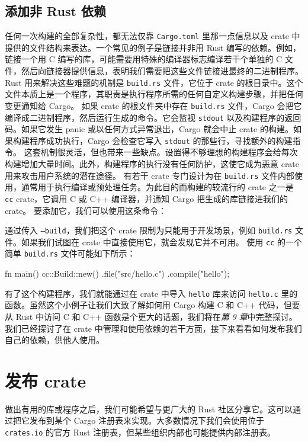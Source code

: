 \subsection{添加非 Rust 依赖}
\label{idx:idx_6a9cbb19}
任何一次构建的全部复杂性，都无法仅靠 \texttt{Cargo.toml} 里那一点信息以及 crate 中提供的文件结构来表达。一个常见的例子是链接并非用 Rust 编写的依赖。例如，链接一个用 C 编写的库，可能需要用特殊的编译器标志编译若干个单独的 C 文件，然后向链接器提供信息，表明我们需要把这些文件链接进最终的二进制程序。
Rust 用来解决这些难题的机制是 \texttt{build.rs} 文件，它位于 crate 的根目录中。这个文件本质上是一个程序，其职责是执行程序所需的任何自定义构建步骤，并把任何变更通知给 Cargo。
如果 crate 的根文件夹中存在 \texttt{build.rs} 文件，Cargo 会把它编译成二进制程序，然后运行生成的命令。它会监视 \texttt{stdout} 以及构建程序的返回码。如果它发生 panic 或以任何方式异常退出，Cargo 就会中止 crate 的构建。如果构建程序成功执行，Cargo 会检查它写入 \texttt{stdout} 的那些行，寻找额外的构建指令。
\label{idx:idx_a601076a}
这套机制很灵活，但也带来一些缺点。设置得不够理想的构建程序会给每次构建增加大量时间。此外，构建程序的执行没有任何防护，这使它成为恶意 crate 用来攻击用户系统的潜在途径。
有若干 crate 专门设计为在 \texttt{build.rs} 文件内部使用，通常用于执行编译或预处理任务。为此目的而构建的较流行的 crate 之一是 \texttt{cc} crate，它调用 C 或 C++ 编译器，并通知 Cargo 把生成的库链接进我们的 crate。
要添加它，我们可以使用这条命令：
通过传入 \texttt{--build}，我们把这个 crate 限制为只能用于开发场景，例如
\texttt{build.rs} 文件。如果我们试图在 crate 中直接使用它，就会发现它并不可用。
使用 \texttt{cc} 的一个简单 \texttt{build.rs} 文件可能如下所示：
\begin{codebox}[rust]
fn main() {
    cc::Build::new()
        .file("src/hello.c")
        .compile("hello");
}
\end{codebox}
\label{idx:idx_0c5153d5}
有了这个构建程序，我们就能通过在 crate 中导入 \texttt{hello} 库来访问 \texttt{hello.c} 里的函数。虽然这个小例子让我们大致了解如何用 Cargo 构建 C 和 C++ 代码，但要从 Rust 中访问 C 和 C++ 函数是个更大的话题，我们将在\emph{第 9 章}中完整探讨。
我们已经探讨了在 crate 中管理和使用依赖的若干方面，接下来看看如何发布我们自己的依赖，供他人使用。
\section{发布 crate}
\label{idx:idx_147c0b5a}
做出有用的库或程序之后，我们可能希望与更广大的 Rust 社区分享它。这可以通过把它发布到某个 Cargo 注册表来实现。大多数情况下我们会使用位于 \texttt{crates.io} 的官方 Rust 注册表，但某些组织内部也可能提供内部注册表。
